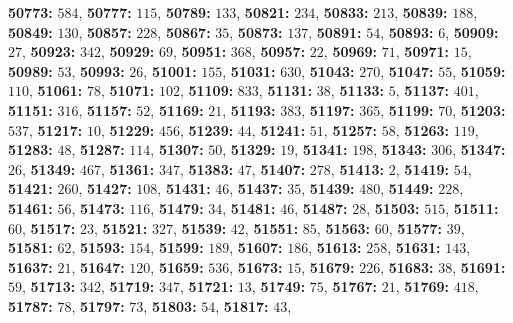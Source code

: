 \textsf{\bfseries 50773:} $584$, \textsf{\bfseries 50777:} $115$, \textsf{\bfseries 50789:} $133$, \textsf{\bfseries 50821:} $234$, \textsf{\bfseries 50833:} $213$, \textsf{\bfseries 50839:} $188$, \textsf{\bfseries 50849:} $130$, \textsf{\bfseries 50857:} $228$, \textsf{\bfseries 50867:} $35$, \textsf{\bfseries 50873:} $137$, \textsf{\bfseries 50891:} $54$, \textsf{\bfseries 50893:} $6$, \textsf{\bfseries 50909:} $27$, \textsf{\bfseries 50923:} $342$, \textsf{\bfseries 50929:} $69$, \textsf{\bfseries 50951:} $368$, \textsf{\bfseries 50957:} $22$, \textsf{\bfseries 50969:} $71$, \textsf{\bfseries 50971:} $15$, \textsf{\bfseries 50989:} $53$, \textsf{\bfseries 50993:} $26$, \textsf{\bfseries 51001:} $155$, \textsf{\bfseries 51031:} $630$, \textsf{\bfseries 51043:} $270$, \textsf{\bfseries 51047:} $55$, \textsf{\bfseries 51059:} $110$, \textsf{\bfseries 51061:} $78$, \textsf{\bfseries 51071:} $102$, \textsf{\bfseries 51109:} $833$, \textsf{\bfseries 51131:} $38$, \textsf{\bfseries 51133:} $5$, \textsf{\bfseries 51137:} $401$, \textsf{\bfseries 51151:} $316$, \textsf{\bfseries 51157:} $52$, \textsf{\bfseries 51169:} $21$, \textsf{\bfseries 51193:} $383$, \textsf{\bfseries 51197:} $365$, \textsf{\bfseries 51199:} $70$, \textsf{\bfseries 51203:} $537$, \textsf{\bfseries 51217:} $10$, \textsf{\bfseries 51229:} $456$, \textsf{\bfseries 51239:} $44$, \textsf{\bfseries 51241:} $51$, \textsf{\bfseries 51257:} $58$, \textsf{\bfseries 51263:} $119$, \textsf{\bfseries 51283:} $48$, \textsf{\bfseries 51287:} $114$, \textsf{\bfseries 51307:} $50$, \textsf{\bfseries 51329:} $19$, \textsf{\bfseries 51341:} $198$, \textsf{\bfseries 51343:} $306$, \textsf{\bfseries 51347:} $26$, \textsf{\bfseries 51349:} $467$, \textsf{\bfseries 51361:} $347$, \textsf{\bfseries 51383:} $47$, \textsf{\bfseries 51407:} $278$, \textsf{\bfseries 51413:} $2$, \textsf{\bfseries 51419:} $54$, \textsf{\bfseries 51421:} $260$, \textsf{\bfseries 51427:} $108$, \textsf{\bfseries 51431:} $46$, \textsf{\bfseries 51437:} $35$, \textsf{\bfseries 51439:} $480$, \textsf{\bfseries 51449:} $228$, \textsf{\bfseries 51461:} $56$, \textsf{\bfseries 51473:} $116$, \textsf{\bfseries 51479:} $34$, \textsf{\bfseries 51481:} $46$, \textsf{\bfseries 51487:} $28$, \textsf{\bfseries 51503:} $515$, \textsf{\bfseries 51511:} $60$, \textsf{\bfseries 51517:} $23$, \textsf{\bfseries 51521:} $327$, \textsf{\bfseries 51539:} $42$, \textsf{\bfseries 51551:} $85$, \textsf{\bfseries 51563:} $60$, \textsf{\bfseries 51577:} $39$, \textsf{\bfseries 51581:} $62$, \textsf{\bfseries 51593:} $154$, \textsf{\bfseries 51599:} $189$, \textsf{\bfseries 51607:} $186$, \textsf{\bfseries 51613:} $258$, \textsf{\bfseries 51631:} $143$, \textsf{\bfseries 51637:} $21$, \textsf{\bfseries 51647:} $120$, \textsf{\bfseries 51659:} $536$, \textsf{\bfseries 51673:} $15$, \textsf{\bfseries 51679:} $226$, \textsf{\bfseries 51683:} $38$, \textsf{\bfseries 51691:} $59$, \textsf{\bfseries 51713:} $342$, \textsf{\bfseries 51719:} $347$, \textsf{\bfseries 51721:} $13$, \textsf{\bfseries 51749:} $75$, \textsf{\bfseries 51767:} $21$, \textsf{\bfseries 51769:} $418$, \textsf{\bfseries 51787:} $78$, \textsf{\bfseries 51797:} $73$, \textsf{\bfseries 51803:} $54$, \textsf{\bfseries 51817:} $43$, 
